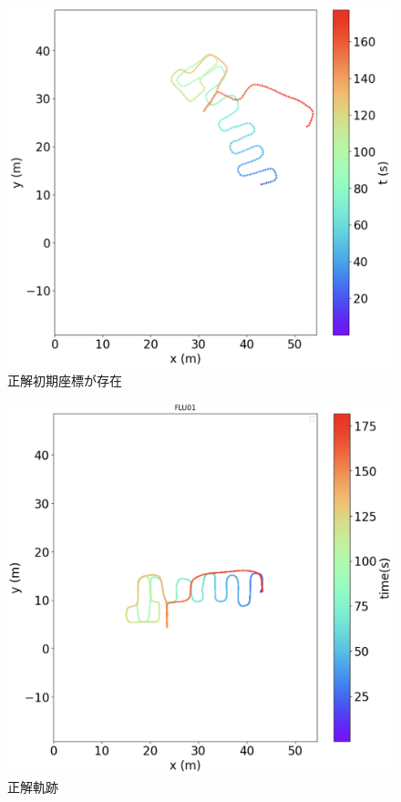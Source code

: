 \begin{figure}[H]
    \centering
    \includegraphics[width=\linewidth]{../image/pdr-move.jpg}
    \caption{正解初期座標が存在}    \label{fig:pdr-move}
\end{figure}


\begin{figure}[H]
    \centering
    \includegraphics[width=\linewidth]{../image/gt2.jpg}
    \caption{正解軌跡}    \label{fig:gt-trajectory}
\end{figure}




